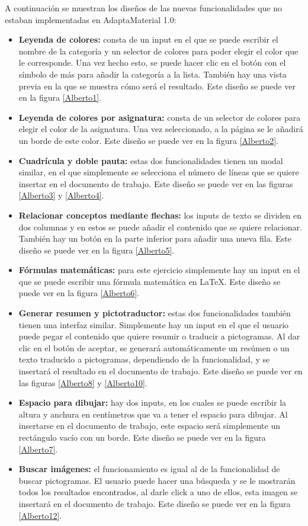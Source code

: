 A continuación se muestran los diseños de las nuevas funcionalidades que no estaban implementadas en AdaptaMaterial 1.0:

\begin{itemize}
  \item \textbf{Leyenda de colores:} consta de un input en el que se puede escribir el nombre de la categoría y un selector de colores para poder elegir el color que le corresponde. Una vez hecho esto, se puede hacer clic en el botón con el símbolo de más para añadir la categoría a la lista. También hay una vista previa en la que se muestra cómo será el resultado. Este diseño se puede ver en la figura \ref{Alberto1}.
  \item \textbf{Leyenda de colores por asignatura:} consta de un selector de colores para elegir el color de la asignatura. Una vez seleccionado, a la página se le añadirá un borde de este color. Este diseño se puede ver en la figura \ref{Alberto2}.
  \item \textbf{Cuadrícula y doble pauta:} estas dos funcionalidades tienen un modal similar, en el que simplemente se selecciona el número de líneas que se quiere insertar en el documento de trabajo. Este diseño se puede ver en las figuras \ref{Alberto3} y \ref{Alberto4}.
  \item \textbf{Relacionar conceptos mediante flechas:} los inputs de texto se dividen en dos columnas y en estos se puede añadir el contenido que se quiere relacionar. También hay un botón en la parte inferior para añadir una nueva fila. Este diseño se puede ver en la figura \ref{Alberto5}.
  \item \textbf{Fórmulas matemáticas:} para este ejercicio simplemente hay un input en el que se puede escribir una fórmula matemática en LaTeX. Este diseño se puede ver en la figura \ref{Alberto6}.
  \item \textbf{Generar resumen y pictotraductor:} estas dos funcionalidades también tienen una interfaz similar. Simplemente hay un input en el que el usuario puede pegar el contenido que quiere resumir o traducir a pictogramas. Al dar clic en el botón de aceptar, se generará automáticamente un resúmen o un texto traducido a pictogramas, dependiendo de la funcionalidad, y se insertará el resultado en el documento de trabajo. Este diseño se puede ver en las figuras \ref{Alberto8} y \ref{Alberto10}.
  \item \textbf{Espacio para dibujar:} hay dos inputs, en los cuales se puede escribir la altura y anchura en centímetros que va a tener el espacio para dibujar. Al insertarse en el documento de trabajo, este espacio será simplemente un rectángulo vacío con un borde. Este diseño se puede ver en la figura \ref{Alberto7}.
  \item \textbf{Buscar imágenes:} el funcionamiento es igual al de la funcionalidad de buscar pictogramas. El usuario puede hacer una búsqueda y se le mostrarán todos los resultados encontrados, al darle click a uno de ellos, esta imagen se insertará en el documento de trabajo. Este diseño se puede ver en la figura \ref{Alberto12}.
\end{itemize}

